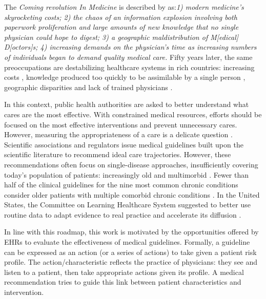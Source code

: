 \documentclass[french,12pt,twoside,a4paper]{book}
\begin{document}
The \emph{Coming revolution In Medicine} is described by
\cite{rutstein1967coming} as:\textit{1) modern medicine's skyrocketing costs; 2)
  the chaos of an information explosion involving both paperwork proliferation and
  large amounts of new knowledge that no single physician could hope to digest; 3)
  a geographic maldistribution of M[edical] D[octors]s; 4) increasing demands on
  the physician's time as increasing numbers of individuals began to demand
  quality medical care.} \textcolor{h_color}{Fifty years later, the same preoccupations are
  destabilizing healthcare systems in rich countries:} increasing costs
\citep{data_oecd_health_spending}, knowledge produced too quickly to be
assimilable by a single person \citep{mcginnis2013best}, geographic disparities
and lack of trained physicians \citep{anguis2021quelle,aamc2021}.

In this context, public health authorities are asked to better understand what
cares are the most effective. With constrained medical resources, efforts should
be focused on the most effective interventions and prevent unnecessary cares.
However, measuring the appropriateness of a care is a delicate question
\citep{cma_policy_appropriateness_2015}. Scientific associations and regulators
issue medical guidelines built upon the scientific literature to recommend ideal
care trajectories. However, these recommendations often focus on single-disease
approaches, insufficiently covering today's population of patients: increasingly
old and multimorbid \citep{skou2022multimorbidity}. \textcolor{h_color}{Fewer than half of the
  clinical guidelines for the nine most common chronic conditions consider older
  patients with multiple comorbid chronic conditions}
\citep{boyd2005clinical,parekh2010challenge}. In the United States, the
Committee on Learning Healthcare System suggested to better use routine data to
adapt evidence to real practice and accelerate its diffusion
\citep{mcginnis2013best}.

In line with this roadmap, this work is motivated by the opportunities offered by
EHRs to evaluate the effectiveness of medical guidelines. Formally, a
guideline can be expressed as an action (or a series of actions) to take given a
patient risk profile. The action/characteristic reflects the
practice of  physicians: they see and listen to a patient, then take
appropriate actions given its profile. A medical recommendation tries to
guide this link between patient characteristics and intervention.
\end{document}
